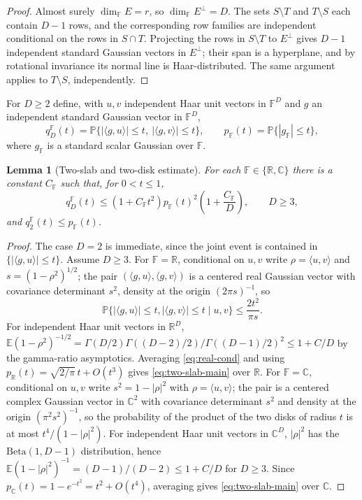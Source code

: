 \documentclass[preprint,12pt]{elsarticle}
\newtheorem{lemma}[theorem]{Lemma}
\newcommand{\R}{\mathbb{R}}
\newcommand{\C}{\mathbb{C}}
\newcommand{\F}{\mathbb{F}}
\newcommand{\PP}{\mathbb{P}}
\newcommand{\EE}{\mathbb{E}}
\begin{document}
\begin{proof}
Almost surely $\dim_\F E=r$, so $\dim_\F E^\perp=D$. The sets $S\setminus T$ and $T\setminus S$ each
contain $D-1$ rows, and the corresponding row families are independent conditional on the rows in
$S\cap T$. Projecting the rows in $S\setminus T$ to $E^\perp$ gives $D-1$ independent standard Gaussian
vectors in $E^\perp$; their span is a hyperplane, and by rotational invariance its normal line is
Haar-distributed. The same argument applies to $T\setminus S$, independently.
\end{proof}

For $D\ge2$ define, with $u,v$ independent Haar unit vectors in $\F^D$ and $g$ an independent standard
Gaussian vector in $\F^D$,
\begin{equation}\label{eq:qD}
  q_D^\F(t)=\PP\{|\langle g,u\rangle|\le t,\ |\langle g,v\rangle|\le t\},
  \qquad
  p_\F(t)=\PP\{|g_\F|\le t\},
\end{equation}
where $g_\F$ is a standard scalar Gaussian over $\F$.

\begin{lemma}[Two-slab and two-disk estimate]\label{lem:two-slab}
For each $\F\in\{\R,\C\}$ there is a constant $C_\F$ such that, for $0<t\le1$,
\begin{equation}\label{eq:two-slab-main}
  q_D^\F(t)\le (1+C_\F t^2)p_\F(t)^2\left(1+\frac{C_\F}{D}\right),\qquad D\ge3,
\end{equation}
and $q_2^\F(t)\le p_\F(t)$.
\end{lemma}

\begin{proof}
The case $D=2$ is immediate, since the joint event is contained in $\{|\langle g,u\rangle|\le t\}$.
Assume $D\ge3$. For $\F=\R$, conditional on $u,v$ write $\rho=\langle u,v\rangle$ and
$s=(1-\rho^2)^{1/2}$; the pair $(\langle g,u\rangle,\langle g,v\rangle)$ is a centered real Gaussian
vector with covariance determinant $s^2$, density at the origin $(2\pi s)^{-1}$, so
\begin{equation}\label{eq:real-cond}
  \PP\{|\langle g,u\rangle|\le t, |\langle g,v\rangle|\le t\mid u,v\}\le \frac{2t^2}{\pi s}.
\end{equation}
For independent Haar unit vectors in $\R^D$,
$\EE(1-\rho^2)^{-1/2}=\Gamma(D/2)\Gamma((D-2)/2)/\Gamma((D-1)/2)^2\le1+C/D$ by the gamma-ratio
asymptotics. Averaging \eqref{eq:real-cond} and using $p_\R(t)=\sqrt{2/\pi}\,t+O(t^3)$ gives
\eqref{eq:two-slab-main} over $\R$. For $\F=\C$, conditional on $u,v$ write $s^2=1-|\rho|^2$ with
$\rho=\langle u,v\rangle$; the pair is a centered complex Gaussian vector in $\C^2$ with covariance
determinant $s^2$ and density at the origin $(\pi^2 s^2)^{-1}$, so the probability of the product of
the two disks of radius $t$ is at most $t^4/(1-|\rho|^2)$. For independent Haar unit vectors in $\C^D$,
$|\rho|^2$ has the $\mathrm{Beta}(1,D-1)$ distribution, hence
$\EE(1-|\rho|^2)^{-1}=(D-1)/(D-2)\le1+C/D$ for $D\ge3$. Since $p_\C(t)=1-e^{-t^2}=t^2+O(t^4)$, averaging
gives \eqref{eq:two-slab-main} over $\C$.
\end{proof}
\end{document}
